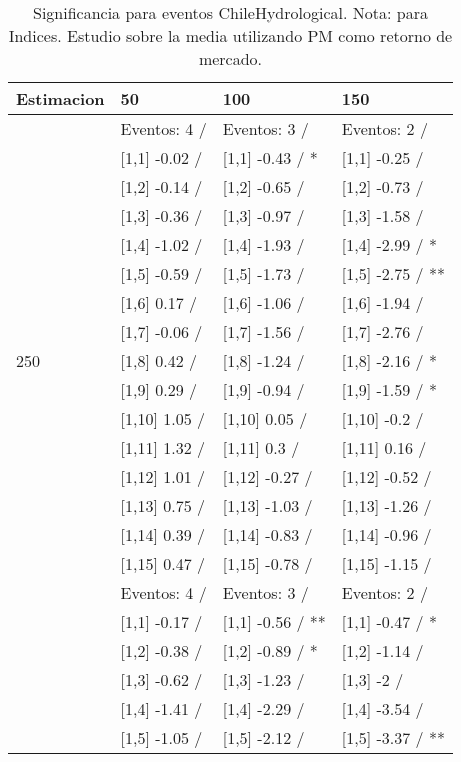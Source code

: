 \begin{table}

\caption{Significancia para eventos ChileHydrological. Nota: para Indices. Estudio sobre la media utilizando PM como retorno de mercado.}
\centering
\begin{tabular}[t]{llll}
\toprule
Estimacion & 50 & 100 & 150\\
\midrule
 & Eventos:  4 / & Eventos:  3 / & Eventos:  2 /\\
 & {}[1,1] -0.02  / & {}[1,1] -0.43  / * & {}[1,1] -0.25  /\\
 & {}[1,2] -0.14  / & {}[1,2] -0.65  / & {}[1,2] -0.73  /\\
 & {}[1,3] -0.36  / & {}[1,3] -0.97  / & {}[1,3] -1.58  /\\
 & {}[1,4] -1.02  / & {}[1,4] -1.93  / & {}[1,4] -2.99  / *\\
\addlinespace
 & {}[1,5] -0.59  / & {}[1,5] -1.73  / & {}[1,5] -2.75  / **\\
 & {}[1,6] 0.17  / & {}[1,6] -1.06  / & {}[1,6] -1.94  /\\
 & {}[1,7] -0.06  / & {}[1,7] -1.56  / & {}[1,7] -2.76  /\\
250 & {}[1,8] 0.42  / & {}[1,8] -1.24  / & {}[1,8] -2.16  / *\\
 & {}[1,9] 0.29  / & {}[1,9] -0.94  / & {}[1,9] -1.59  / *\\
\addlinespace
 & {}[1,10] 1.05  / & {}[1,10] 0.05  / & {}[1,10] -0.2  /\\
 & {}[1,11] 1.32  / & {}[1,11] 0.3  / & {}[1,11] 0.16  /\\
 & {}[1,12] 1.01  / & {}[1,12] -0.27  / & {}[1,12] -0.52  /\\
 & {}[1,13] 0.75  / & {}[1,13] -1.03  / & {}[1,13] -1.26  /\\
 & {}[1,14] 0.39  / & {}[1,14] -0.83  / & {}[1,14] -0.96  /\\
\addlinespace
 & {}[1,15] 0.47  / & {}[1,15] -0.78  / & {}[1,15] -1.15  /\\
 & Eventos:  4 / & Eventos:  3 / & Eventos:  2 /\\
 & {}[1,1] -0.17  / & {}[1,1] -0.56  / ** & {}[1,1] -0.47  / *\\
 & {}[1,2] -0.38  / & {}[1,2] -0.89  / * & {}[1,2] -1.14  /\\
 & {}[1,3] -0.62  / & {}[1,3] -1.23  / & {}[1,3] -2  /\\
\addlinespace
 & {}[1,4] -1.41  / & {}[1,4] -2.29  / & {}[1,4] -3.54  /\\
 & {}[1,5] -1.05  / & {}[1,5] -2.12  / & {}[1,5] -3.37  / **\\

\end{tabular}
\end{table}
